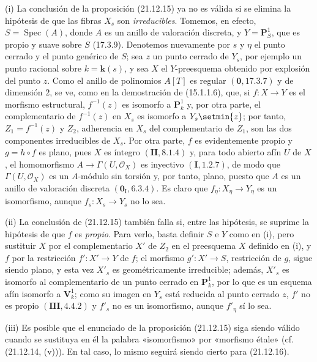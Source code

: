 \begin{remarks}[21.12.17]
\label{IV.21.12.17}
(i) La conclusión de la proposición (21.12.15) ya no es válida si se elimina
la hipótesis de que las fibras $X_s$ son \emph{irreducibles}. Tomemos, en efecto,
$S=\operatorname{Spec}(A)$, donde $A$ es un anillo de valoración discreta, y
$Y=\mathbf P^1_S$, que es propio y suave sobre $S$ (17.3.9). Denotemos nuevamente por $s$ y
$\eta$ el punto cerrado y el punto genérico de $S$; sea $z$ un punto cerrado de $Y_s$,
por ejemplo un punto racional sobre $k=\boldsymbol{k}(s)$, y sea $X$ el $Y$-preesquema obtenido por
explosión del punto $z$. Como el anillo de polinomios $A[T]$ es regular
$(\mathbf 0, 17.3.7)$ y de dimensión $2$, se ve, como en la demostración de
(15.1.1.6), que, si $f:X\to Y$ es el morfismo estructural, $f^{-1}(z)$ es isomorfo
a $\mathbf P^1_k$ y, por otra parte, el complementario de $f^{-1}(z)$ en $X_s$ es
isomorfo a $Y_s\setmin\{z\}$; por tanto, $Z_1=f^{-1}(z)$ y $Z_2$, adherencia en $X_s$ del
complementario de $Z_1$, son las dos componentes irreducibles de $X_s$. Por
otra parte, $f$ es evidentemente propio y $g=h\circ f$ es plano, pues $X$ es íntegro
$(\mathbf{II}, 8.1.4)$ y, para todo abierto afín $U$ de $X$, el homomorfismo
$A\to\Gamma(U,\mathcal O_X)$ es inyectivo $(\mathbf I, 1.2.7)$, de modo que
$\Gamma(U,\mathcal O_X)$ es un $A$-módulo sin torsión y, por tanto, plano, puesto que $A$
es un anillo de valoración discreta $(\mathbf 0_{\mathrm I}, 6.3.4)$. Es claro que
$f_\eta:X_\eta\to Y_\eta$ es un isomorfismo, aunque
$f_s:X_s\to Y_s$ no lo sea.

(ii) La conclusión de (21.12.15) también falla si, entre las hipótesis, se
suprime la hipótesis de que $f$ es \emph{propio}. Para verlo, basta definir $S$ e
$Y$ como en (i), pero sustituir $X$ por el complementario $X'$ de $Z_2$ en el
preesquema $X$ definido en (i), y $f$ por la restricción $f':X'\to Y$ de $f$; el morfismo
$g':X'\to S$, restricción de $g$, sigue siendo plano, y esta vez $X'_s$ es
geométricamente irreducible; además, $X'_s$ es isomorfo al complementario de un
punto cerrado en $\mathbf P^1_k$, por lo que es un esquema afín isomorfo a $\mathbf V^1_k$;
como su imagen en $Y_s$ está reducida al punto cerrado $z$, $f'$ no es propio
$(\mathbf{III}, 4.4.2)$ y $f'_s$ no es un isomorfismo, aunque $f'_\eta$ sí lo sea.

(iii) Es posible que el enunciado de la proposición (21.12.15) siga siendo válido cuando se
sustituya en él la palabra «isomorfismo» por «morfismo étale» (cf. (21.12.14, (v))). En
tal caso, lo mismo seguirá siendo cierto para (21.12.16).
\end{remarks}
